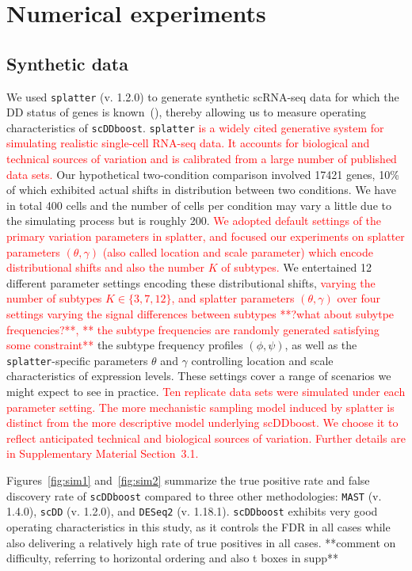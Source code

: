 \documentclass[aoas,preprint]{imsart}
\begin{document}
 
\section{Numerical experiments}

\subsection{Synthetic data} 
We used \verb+splatter+ (v. 1.2.0)  
to generate synthetic scRNA-seq  data for which the DD status of genes is known~(\cite{ref:Zappia}), 
 thereby allowing us to 
measure operating characteristics of \verb+scDDboost+. 
 \verb+splatter+ \textcolor{red}{is a widely cited generative system for simulating realistic
single-cell RNA-seq data. It accounts for biological and technical sources of variation and is calibrated
from a large number of published data sets. } 
Our hypothetical two-condition comparison involved
17421 genes, 10\% of which exhibited actual shifts in distribution between two conditions.
We have in total 400 cells and the number of cells per condition may vary a little due to the simulating process but is roughly 200. 
\textcolor{red}{We adopted default settings of the primary variation parameters in splatter, and focused 
our experiments on splatter parameters $(\theta, \gamma)$ (also called location and scale parameter) which encode distributional
shifts and also the number $K$ of subtypes.  }
We entertained 12 different parameter settings encoding these distributional shifts, 
\textcolor{red}{ varying the number of subtypes $K\in\{3,7,12\}$,  and splatter parameters $(\theta,\gamma)$ over
four settings varying the signal differences between subtypes **?what about subytpe frequencies?**, ** the subtype frequencies are randomly generated satisfying some constraint**}
the subtype frequency profiles $(\phi,\psi)$, as well
as the  \verb+splatter+-specific parameters $\theta$ and $\gamma$ controlling location and scale characteristics
of expression levels. These settings cover a range
of scenarios we might expect to see in practice.  \textcolor{red}{Ten replicate data sets were simulated under each parameter setting.
 The more mechanistic sampling model induced by splatter is distinct from the more descriptive model 
underlying scDDboost.  We choose it to reflect anticipated technical and biological sources of 
variation.  Further details are in Supplementary Material Section~3.1.}

Figures~\ref{fig:sim1} and~\ref{fig:sim2} summarize the true positive rate and false discovery rate
of \verb+scDDboost+ compared to three other methodologies: \verb+MAST+ (v. 1.4.0), \verb+scDD+ (v. 1.2.0), and 
\verb+DESeq2+ (v. 1.18.1). 
\verb+scDDboost+ exhibits very good operating characteristics in this study, as it controls the 
FDR in all cases while also delivering a relatively high rate of true positives in all cases.
**comment on difficulty, referring to horizontal ordering and also t boxes in supp**
\end{document}
